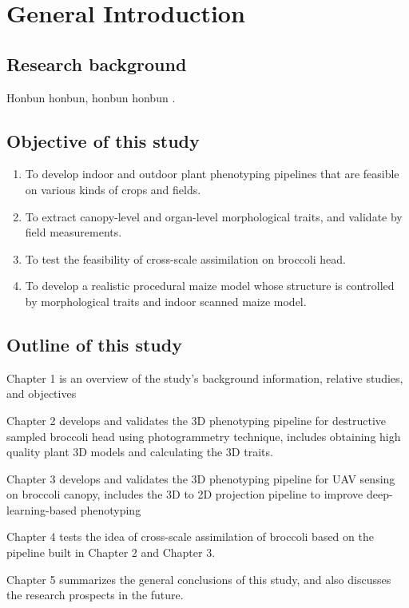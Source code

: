 \chapter{General Introduction}

\section{Research background}

Honbun honbun, honbun honbun \citep{guo_deep_2019, zhao_crop_2019}. 


\section{Objective of this study}

\begin{enumerate}
    \item To develop indoor and outdoor plant phenotyping pipelines that are feasible on various kinds of crops and fields. 
    \item To extract canopy-level and organ-level morphological traits, and validate by field measurements.
    \item To test the feasibility of cross-scale assimilation on broccoli head.
    \item To develop a realistic procedural maize model whose structure is controlled by morphological traits and indoor scanned maize model.
\end{enumerate}


\section{Outline of this study}

Chapter 1 is an overview of the study's background information, relative studies, and objectives

Chapter 2 develops and validates the 3D phenotyping pipeline for destructive sampled broccoli head using photogrammetry technique, includes obtaining high quality plant 3D models and calculating the 3D traits.

Chapter 3 develops and validates the 3D phenotyping pipeline for UAV sensing on broccoli canopy, includes the 3D to 2D projection pipeline to improve deep-learning-based phenotyping

Chapter 4 tests the idea of cross-scale assimilation of broccoli based on the pipeline built in Chapter 2 and Chapter 3.

Chapter 5 summarizes the general conclusions of this study, and also discusses the research prospects in the future.